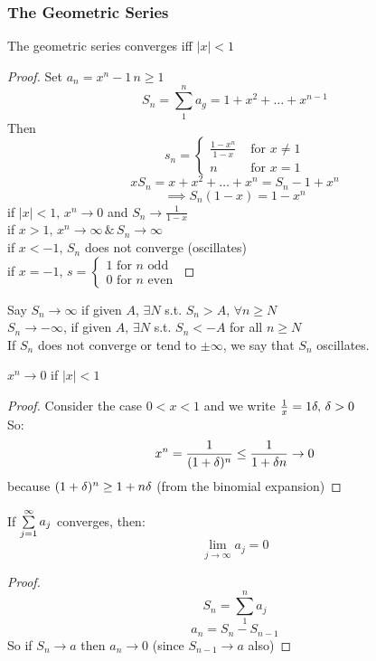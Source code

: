 \subsubsection{The Geometric Series}
\begin{claim}
The geometric series converges iff $|x|<1$
\begin{proof}
Set $a_n = x^n-1\, n \geq 1$
\[S_n = \sum_1^n a_g = 1 + x^2 + \dots + x^{n-1}\]
Then \[s_n = \begin{cases} \frac{1-x^n}{1-x} &\text{ for } x \neq 1 \\ n&\text{ for } x = 1 \end{cases}\]
\[xS_n = x + x^2 + \dots + x^n = S_n - 1 + x^n\]
\[\implies S_n(1-x) = 1-x^n\]
if $|x|<1,\, x^n \to 0$ and $S_n \to \frac{1}{1-x}$\\
if $x>1, \, x^n \to \infty \, \&\, S_n \to \infty$\\
if $x < -1, \,S_n$ does not converge (oscillates)\\
if $x = -1,\, s = \begin{cases} 1 \text{ for } n \text{ odd}\\ 0 \text{ for } n \text{ even}\end{cases}$
\end{proof}
\end{claim}
\begin{note}
Say $S_n \to \infty$ if given $A$, $\exists N$ s.t. $S_n > A,\, \forall n \geq N$\\
$S_n \to - \infty$, if given $A,\, \exists N$ s.t. $S_n < -A$ for all $n \geq N$\\
If $S_n$ does not converge or tend to $\pm \infty$, we say that $S_n$ oscillates.
\end{note}
\begin{claim}
$x^n \to 0$ if $|x| < 1$
\begin{proof}
Consider the case $0 < x < 1$ and we write $\frac{1}{x} = 1 \de,\,\de > 0$\\
So: \[ x^n = \frac{1}{(1+\de)^n} \leq \frac{1}{1 + \de n}\to 0\]
because $(1+\de )^n \geq 1 + n\de$ (from the binomial expansion)
\end{proof}
\end{claim}
\begin{lemma}
If $\s[j]{\infty}a_j$ converges, then: \[\lim\limits_{j \to \infty} a_j = 0\]
\begin{proof}
\[S_n = \sum_1^n a_j\]
\[a_n = S_n - S_{n-1}\]
So if $S_n \to a$ then $a_n \to 0$ (since $S_{n-1} \to a$ also)
\end{proof}
\end{lemma}
